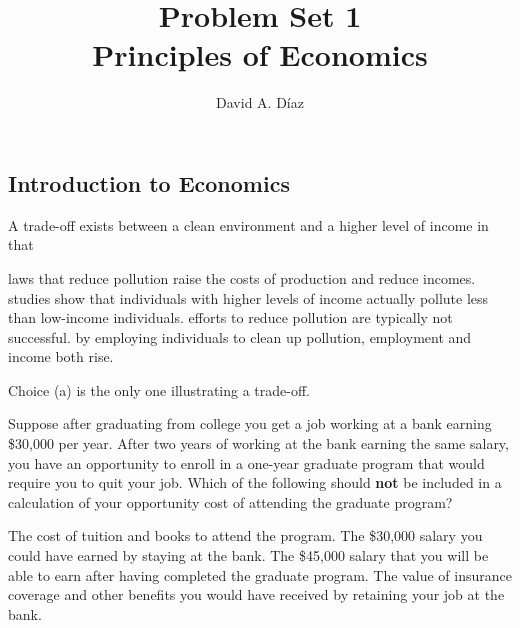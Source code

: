 \documentclass[addpoints,11pt]{exam}
\theoremstyle{definition}
\newcommand{\dd}[1]{}
\begin{document}
\title{\textbf{Problem Set 1 \dd{Answers and Selected Solutions}} \\ \vspace{2 mm} {\large Principles of Economics}}
\author{David A. D\'iaz}
\date{}
\maketitle



\subsection*{Introduction to Economics}

\begin{questions}
	
	\question A trade-off exists between a clean environment and a higher level of income in that 
		\begin{choices}
			\CorrectChoice laws that reduce pollution raise the costs of production and reduce incomes.
			\choice studies show that individuals with higher levels of income actually pollute less than low-income individuals.
			\choice efforts to reduce pollution are typically not successful.
			\choice by employing individuals to clean up pollution, employment and income both rise.
		\end{choices}
		
		\begin{solution}
			Choice (a) is the only one illustrating a trade-off.
		\end{solution}
		
	\question Suppose after graduating from college you get a job working at a bank earning \$30,000 per year. After two years of working at the bank earning the same salary, you have an opportunity to enroll in a one-year graduate program that would require you to quit your job. Which of the following should \textbf{not} be included in a calculation of your opportunity cost of attending the graduate program?
	
	\begin{choices}
		\choice The cost of tuition and books to attend the program.
		\choice The \$30,000 salary you could have earned by staying at the bank.
		\CorrectChoice The \$45,000 salary that you will be able to earn after having completed the graduate program.
		\choice The value of insurance coverage and other benefits you would have received by retaining your job at the bank.
	\end{choices}
	

\end{questions}
\end{document}
